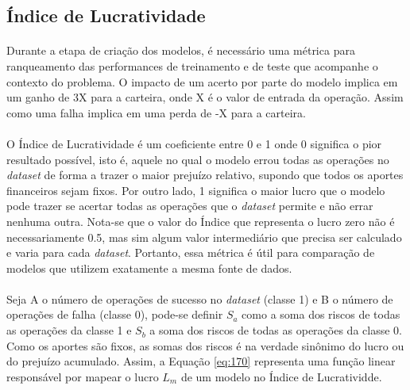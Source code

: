 \FloatBarrier
\subsection{Índice de Lucratividade}
\label{sub:profit_index}

\paragraph{} Durante a etapa de criação dos modelos, é necessário uma métrica para ranqueamento das performances de treinamento e de teste que acompanhe o contexto do problema. O impacto de um acerto por parte do modelo implica em um ganho de 3X para a carteira, onde X é o valor de entrada da operação. Assim como uma falha implica em uma perda de -X para a carteira.

\paragraph{} O Índice de Lucratividade é um coeficiente entre 0 e 1 onde 0 significa o pior resultado possível, isto é, aquele no qual o modelo errou todas as operações no \textit{dataset} de forma a trazer o maior prejuízo relativo, supondo que todos os aportes financeiros sejam fixos. Por outro lado, 1 significa o maior lucro que o modelo pode trazer se acertar todas as operações que o \textit{dataset} permite e não errar nenhuma outra. Nota-se que o valor do Índice que representa o lucro zero não é necessariamente 0.5, mas sim algum valor intermediário que precisa ser calculado e varia para cada \textit{dataset}. Portanto, essa métrica é útil para comparação de modelos que utilizem exatamente a mesma fonte de dados.

\paragraph{} Seja A o número de operações de sucesso no \textit{dataset} (classe 1) e B o número de operações de falha (classe 0), pode-se definir \begin{math} S_a \end{math} como a soma dos riscos de todas as operações da classe 1 e \begin{math} S_b \end{math} a soma dos riscos de todas as operações da classe 0. Como os aportes são fixos, as somas dos riscos é na verdade sinônimo do lucro ou do prejuízo acumulado. Assim, a Equação \ref{eq:170} representa uma função linear responsável por mapear o lucro \begin{math} L_m \end{math} de um modelo no Índice de Lucratividde.

